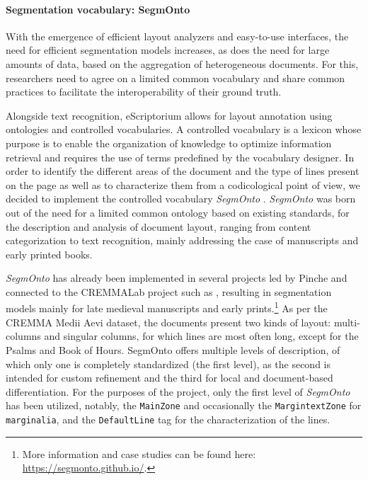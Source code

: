 \documentclass{article}
\begin{document}
\paragraph{Segmentation vocabulary: SegmOnto}

With the emergence of efficient layout analyzers and easy-to-use interfaces, the need for efficient segmentation models increases, as does the need for large amounts of data, based on the aggregation of heterogeneous documents. For this, researchers need to agree on a limited common vocabulary and share common practices to facilitate the interoperability of their ground truth.

Alongside text recognition, eScriptorium allows for layout annotation using ontologies and controlled vocabularies. A controlled vocabulary is a lexicon whose purpose is to enable the organization of knowledge to optimize information retrieval and requires the use of terms predefined by the vocabulary designer. In order to identify the different areas of the document and the type of lines present on the page as well as to characterize them from a codicological point of view, we decided to implement the controlled vocabulary \textit{SegmOnto} \citep{gabay2021segmonto}. \textit{SegmOnto} was born out of the need for a limited common ontology based on existing standards, for the description and analysis of document layout, ranging from content categorization to text recognition, mainly addressing the case of manuscripts and early printed books. 

\textit{SegmOnto} has already been implemented in several projects led by Pinche and connected to the CREMMALab project such as \cite{gallicorpora15}, resulting in segmentation models mainly for late medieval manuscripts and early prints.\footnote{More information and case studies can be found here: \url{https://segmonto.github.io/}.} As per the CREMMA Medii Aevi dataset, the documents present two kinds of layout: multi-columns and singular columns, for which lines are most often long, except for the Psalms and Book of Hours. SegmOnto offers multiple levels of description, of which only one is completely standardized (the first level), as the second is intended for custom refinement and the third for local and document-based differentiation. For the purposes of the project, only the first level of \textit{SegmOnto} has been utilized, notably, the \texttt{MainZone} and occasionally the \texttt{MargintextZone} for \texttt{marginalia}, and the \texttt{DefaultLine} tag for the characterization of the lines. 
\end{document}
